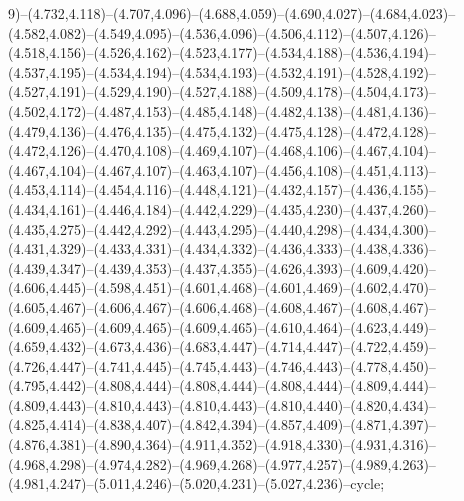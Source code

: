 9)--(4.732,4.118)--(4.707,4.096)--(4.688,4.059)--(4.690,4.027)--(4.684,4.023)--(4.582,4.082)--(4.549,4.095)--(4.536,4.096)--(4.506,4.112)--(4.507,4.126)--(4.518,4.156)--(4.526,4.162)--(4.523,4.177)--(4.534,4.188)--(4.536,4.194)--(4.537,4.195)--(4.534,4.194)--(4.534,4.193)--(4.532,4.191)--(4.528,4.192)--(4.527,4.191)--(4.529,4.190)--(4.527,4.188)--(4.509,4.178)--(4.504,4.173)--(4.502,4.172)--(4.487,4.153)--(4.485,4.148)--(4.482,4.138)--(4.481,4.136)--(4.479,4.136)--(4.476,4.135)--(4.475,4.132)--(4.475,4.128)--(4.472,4.128)--(4.472,4.126)--(4.470,4.108)--(4.469,4.107)--(4.468,4.106)--(4.467,4.104)--(4.467,4.104)--(4.467,4.107)--(4.463,4.107)--(4.456,4.108)--(4.451,4.113)--(4.453,4.114)--(4.454,4.116)--(4.448,4.121)--(4.432,4.157)--(4.436,4.155)--(4.434,4.161)--(4.446,4.184)--(4.442,4.229)--(4.435,4.230)--(4.437,4.260)--(4.435,4.275)--(4.442,4.292)--(4.443,4.295)--(4.440,4.298)--(4.434,4.300)--(4.431,4.329)--(4.433,4.331)--(4.434,4.332)--(4.436,4.333)--(4.438,4.336)--(4.439,4.347)--(4.439,4.353)--(4.437,4.355)--(4.626,4.393)--(4.609,4.420)--(4.606,4.445)--(4.598,4.451)--(4.601,4.468)--(4.601,4.469)--(4.602,4.470)--(4.605,4.467)--(4.606,4.467)--(4.606,4.468)--(4.608,4.467)--(4.608,4.467)--(4.609,4.465)--(4.609,4.465)--(4.609,4.465)--(4.610,4.464)--(4.623,4.449)--(4.659,4.432)--(4.673,4.436)--(4.683,4.447)--(4.714,4.447)--(4.722,4.459)--(4.726,4.447)--(4.741,4.445)--(4.745,4.443)--(4.746,4.443)--(4.778,4.450)--(4.795,4.442)--(4.808,4.444)--(4.808,4.444)--(4.808,4.444)--(4.809,4.444)--(4.809,4.443)--(4.810,4.443)--(4.810,4.443)--(4.810,4.440)--(4.820,4.434)--(4.825,4.414)--(4.838,4.407)--(4.842,4.394)--(4.857,4.409)--(4.871,4.397)--(4.876,4.381)--(4.890,4.364)--(4.911,4.352)--(4.918,4.330)--(4.931,4.316)--(4.968,4.298)--(4.974,4.282)--(4.969,4.268)--(4.977,4.257)--(4.989,4.263)--(4.981,4.247)--(5.011,4.246)--(5.020,4.231)--(5.027,4.236)--cycle;
